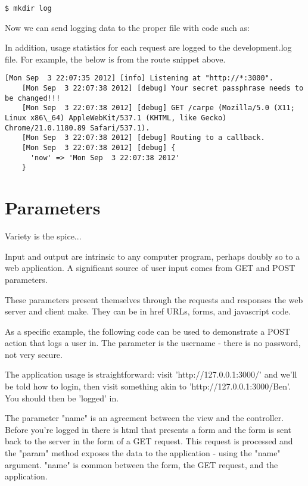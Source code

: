 \documentclass[14pt]{extreport}
\newcommand\Small{\fontsize{12}{13.0}\fontencoding{T1}\selectfont}
\newcommand*\LSTfont{\Small\ttfamily\SetTracking{encoding=*}{-60}\lsstyle}
\begin{document}
\begin{lstlisting}[style=BashInputStyle]
$ mkdir log
\end{lstlisting}

Now we can send logging data to the proper file with code such as:



In addition, usage statistics for each request are logged to the
development.log file.  For example, the below is from the route snippet above.

\begin{lstlisting}[style=BashOutputStyle]
    [Mon Sep  3 22:07:35 2012] [info] Listening at "http://*:3000".
    [Mon Sep  3 22:07:38 2012] [debug] Your secret passphrase needs to be changed!!!
    [Mon Sep  3 22:07:38 2012] [debug] GET /carpe (Mozilla/5.0 (X11; Linux x86\_64) AppleWebKit/537.1 (KHTML, like Gecko) Chrome/21.0.1180.89 Safari/537.1).
    [Mon Sep  3 22:07:38 2012] [debug] Routing to a callback.
    [Mon Sep  3 22:07:38 2012] [debug] {
      'now' => 'Mon Sep  3 22:07:38 2012'
    }
\end{lstlisting}

\section{Parameters}

{\Large Variety is the spice...}

Input and output are intrinsic to any computer program, perhaps doubly so to a
web application.  A significant source of user input comes from GET and POST
parameters.

These parameters present themselves through the requests and responses the web
server and client make.  They can be in href URLs, forms, and javascript code.

As a specific example, the following code can be used to demonstrate a POST
action that logs a user in.  The parameter is the username - there is no
password, not very secure.



The application usage is straightforward: visit 'http://127.0.0.1:3000/' and
we'll be told how to login, then visit something akin to
'http://127.0.0.1:3000/Ben'.  You should then be 'logged' in.

The parameter "name" is an agreement between the view and the controller.
Before you're logged in there is html that presents a form and the form is sent
back to the server in the form of a GET request.  This request is processed
and the "param" method exposes the data to the application - using the "name"
argument.  "name" is common between the form, the GET request, and the
application.
\end{document}
